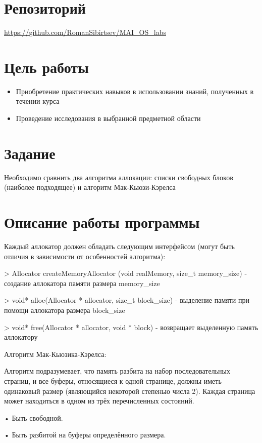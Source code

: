 \documentclass[a4paper, 12pt]{article}
\begin{document}
\section{Репозиторий}
\href{https://github.com/RomanSibirtsev/MAI_OS_labs}{https://github.com/RomanSibirtsev/MAI\_OS\_labs}

\section{Цель работы}
\begin{itemize}
  \item Приобретение практических навыков в использовании знаний, полученных в течении 
  курса
  \item Проведение исследования в выбранной предметной области
\end{itemize}

\section{Задание}
Необходимо сравнить два алгоритма аллокации: списки свободных блоков (наиболее 
подходящее) и алгоритм Мак-Кьюзи-Кэрелса

\section{Описание работы программы}
Каждый аллокатор должен обладать следующим интерфейсом (могут быть отличия в зависимости от 
особенностей алгоритма):

    > Allocator createMemoryAllocator (void realMemory, size\_t memory\_size) - создание аллокатора памяти размера memory\_size

    > void* alloc(Allocator * allocator, size\_t block\_size) - выделение памяти при помощи аллокатора размера block\_size

    > void* free(Allocator * allocator, void * block) - возвращает выделенную память аллокатору


Алгоритм Мак-Кьюзика-Кэрелса:

    Алгоритм подразумевает, что память разбита на набор последовательных страниц, и все буферы, относящиеся к одной странице, должны иметь одинаковый размер (являющийся некоторой степенью числа 2).
    Каждая страница может находиться в одном из трёх перечисленных состояний.

    •	Быть свободной. 

    •	Быть разбитой на буферы определённого размера.
\end{document}
